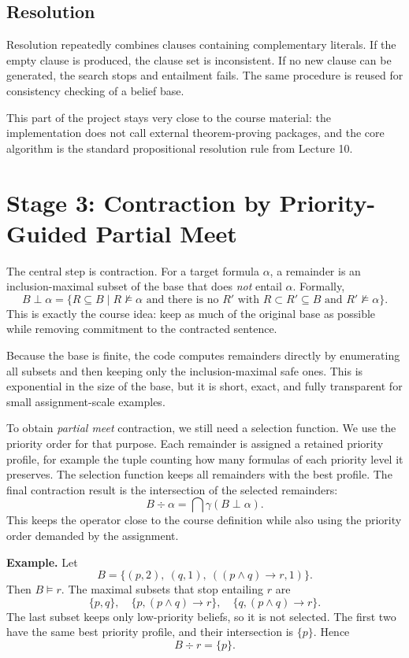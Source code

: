 \documentclass[11pt,a4paper]{article}
\begin{document}
\subsection*{Resolution}
Resolution repeatedly combines clauses containing complementary literals. If the empty clause is produced, the clause set is inconsistent. If no new clause can be generated, the search stops and entailment fails. The same procedure is reused for consistency checking of a belief base.

This part of the project stays very close to the course material: the implementation does not call external theorem-proving packages, and the core algorithm is the standard propositional resolution rule from Lecture 10.

\section{Stage 3: Contraction by Priority-Guided Partial Meet}
The central step is contraction. For a target formula \(\alpha\), a remainder is an inclusion-maximal subset of the base that does \emph{not} entail \(\alpha\). Formally,
\[
B\perp \alpha = \{R \subseteq B \mid R \not\models \alpha \text{ and there is no } R' \text{ with } R \subset R' \subseteq B \text{ and } R' \not\models \alpha\}.
\]
This is exactly the course idea: keep as much of the original base as possible while removing commitment to the contracted sentence.

Because the base is finite, the code computes remainders directly by enumerating all subsets and then keeping only the inclusion-maximal safe ones. This is exponential in the size of the base, but it is short, exact, and fully transparent for small assignment-scale examples.

To obtain \emph{partial meet} contraction, we still need a selection function. We use the priority order for that purpose. Each remainder is assigned a retained priority profile, for example the tuple counting how many formulas of each priority level it preserves. The selection function keeps all remainders with the best profile. The final contraction result is the intersection of the selected remainders:
\[
B \div \alpha = \bigcap \gamma(B\perp \alpha).
\]
This keeps the operator close to the course definition while also using the priority order demanded by the assignment.

\begin{keybox}
\textbf{Example.} Let
\[
B = \{(p,2),\ (q,1),\ ((p \wedge q) \rightarrow r,1)\}.
\]
Then \(B \models r\). The maximal subsets that stop entailing \(r\) are
\[
\{p,q\},\quad \{p,(p \wedge q) \rightarrow r\},\quad \{q,(p \wedge q) \rightarrow r\}.
\]
The last subset keeps only low-priority beliefs, so it is not selected. The first two have the same best priority profile, and their intersection is \(\{p\}\). Hence
\[
B \div r = \{p\}.
\]
\end{keybox}
\end{document}
